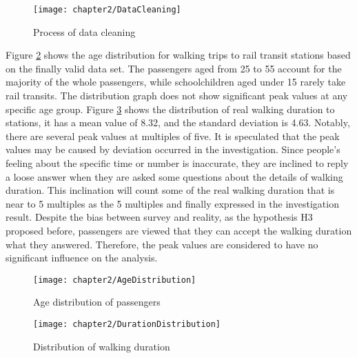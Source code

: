 \begin{figure}[htbp]
	\centering
	\texttt{[image: chapter2/DataCleaning]}
	\caption{Process of data cleaning}
	\label{fig:chp2:DataCleaning}
\end{figure}

%
Figure \ref{fig:chp2:AgeDistribution} shows the age distribution for walking trips to rail transit stations based on the finally valid data set. The passengers aged from 25 to 55 account for the majority of the whole passengers, while schoolchildren aged under 15 rarely take rail transits. The distribution graph does not show significant peak values at any specific age group. Figure \ref{fig:chp2:DurationDistribution} shows the distribution of real walking duration to stations, it has a mean value of 8.32, and the standard deviation is 4.63. Notably, there are several peak values at multiples of five. It is speculated that the peak values may be caused by deviation occurred in the investigation. Since people's feeling about the specific time or number is inaccurate, they are inclined to reply a loose answer when they are asked some questions about the details of walking duration. This inclination will count some of the real walking duration that is near to 5 multiples as the 5 multiples and finally expressed in the investigation result. Despite the bias between survey and reality, as the hypothesis H3 proposed before, passengers are viewed that they can accept the walking duration what they answered. Therefore, the peak values are considered to have no significant influence on the analysis.

\begin{figure}[htbp]
	\centering
	\texttt{[image: chapter2/AgeDistribution]}
	\caption{Age distribution of passengers}
	\label{fig:chp2:AgeDistribution}
\end{figure}

\begin{figure}[htbp]
	\centering
	\texttt{[image: chapter2/DurationDistribution]}
	\caption{Distribution of walking duration}
	\label{fig:chp2:DurationDistribution}
\end{figure}

%
